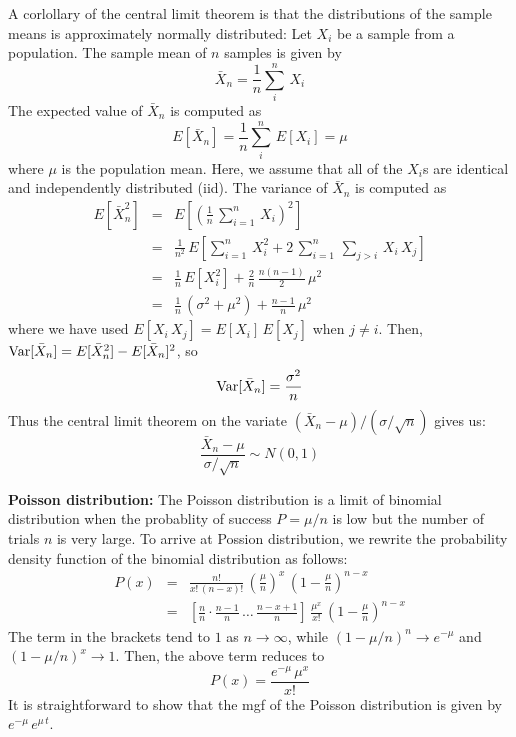 \documentclass[aps,prl,preprint,superscriptaddress]{revtex4-1}
\begin{document}
A corlollary of the central limit theorem is that the distributions of the sample means is
approximately normally distributed: Let $X_i$ be a sample from a population. The sample mean of $n$ samples
is given by
%
\begin{equation}
\bar{X}_n = \frac{1}{n} \sum_i^n\, X_i
\end{equation}
%
The expected value of $\bar{X}_n$ is computed as
%
\begin{equation}
E[\bar{X}_n] = \frac{1}{n}\sum_i^n\, E[X_i] = \mu
\end{equation}
%
where $\mu$ is the population mean. Here, we assume that all of the $X_i$s are identical and independently
distributed (iid). The variance of $\bar{X}_n$ is computed as
%
\begin{eqnarray}
E[\bar{X}_n^2] &=& E\left[ \left( \frac{1}{n}\, \sum_{i=1}^n\, X_i \right)^2 \right] \nonumber\\
               &=& \frac{1}{n^2}\, E\left[ \sum_{i=1}^n\, X_i^2 + 2\, \sum_{i=1}^n\, \sum_{j>i}\, X_i\, X_j \right] \nonumber\\
               &=& \frac{1}{n}\, E[X_i^2] + \frac{2}{n}\, \frac{n (n-1)}{2}\, \mu^2 \nonumber\\
               &=& \frac{1}{n}\, (\sigma^2 + \mu^2) + \frac{n-1}{n}\, \mu^2
\end{eqnarray}
%
where we have used $E[X_i\, X_j] = E[X_i]\, E[X_j]$ when $j\neq i$.
Then, ${\rm Var}[\bar{X}_n] = E[\bar{X}_n^2] - E[\bar{X}_n]^2$, so
%
\begin{equation}
{\rm Var}[\bar{X}_n] = \frac{\sigma^2}{n}
\end{equation}
%
Thus the central limit theorem on the variate $(\bar{X}_n - \mu)/(\sigma/\sqrt{n})$ gives us:
%
\begin{equation}
\frac{\bar{X}_n - \mu}{\sigma/\sqrt{n}} \sim N(0,1)
\end{equation}
%

\vspace{0.5cm}

{\bf Poisson distribution:} The Poisson distribution is a limit of binomial distribution when the probablity of 
success $P = \mu/n$ is low but the number of trials $n$ is very large. To arrive at Possion distribution, we rewrite the 
probability density function of the binomial distribution as follows:
%
\begin{eqnarray}
P(x) &=& \frac{n!}{x!\, (n-x)!}\, \left(\frac{\mu}{n}\right)^x\, \left( 1 - \frac{\mu}{n} \right)^{n-x} \nonumber\\
     &=& \left[ \frac{n}{n} \cdot \frac{n-1}{n}\, \dots \, \frac{n-x+1}{n} \right]\, \frac{\mu^x}{x!}\, 
         \left( 1 - \frac{\mu}{n} \right)^{n-x}
\end{eqnarray}
%
The term in the brackets tend to $1$ as $n\rightarrow \infty$, while $(1-\mu/n)^n \rightarrow e^{-\mu}$ and
$(1-\mu/n)^x \rightarrow 1$. Then, the above term reduces to
%
\begin{equation}
P(x) = \frac{e^{-\mu}\, \mu^x}{x!}
\end{equation}
%
It is straightforward to show that the mgf of the Poisson distribution is given by $e^{-\mu}\, e^{\mu\, t}$.
\end{document}
